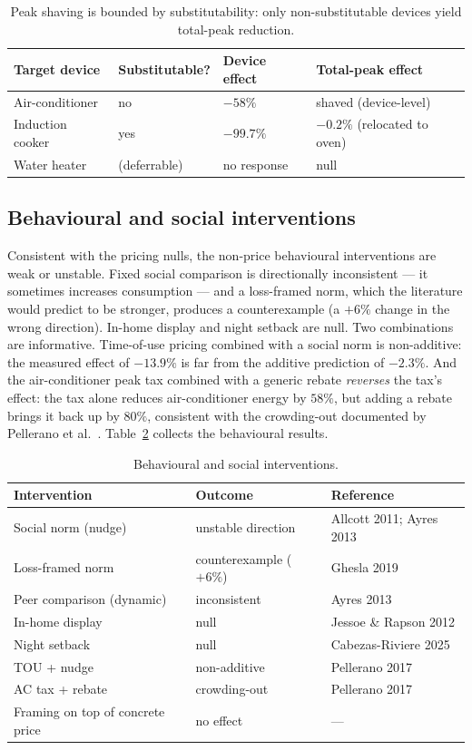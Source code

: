\documentclass[11pt]{article}
\begin{document}
\begin{table}[ht]
\centering\small
\begin{tabular}{llll}
\toprule
Target device & Substitutable? & Device effect & Total-peak effect \\
\midrule
Air-conditioner & no & $-58\%$ & shaved (device-level) \\
Induction cooker & yes & $-99.7\%$ & $-0.2\%$ (relocated to oven) \\
Water heater & (deferrable) & no response & null \\
\bottomrule
\end{tabular}
\caption{Peak shaving is bounded by substitutability: only non-substitutable devices yield total-peak
reduction.}
\label{tab:shave}
\end{table}

\subsection{Behavioural and social interventions}
Consistent with the pricing nulls, the non-price behavioural interventions are weak or unstable. Fixed
social comparison is directionally inconsistent --- it sometimes increases consumption --- and a
loss-framed norm, which the literature would predict to be stronger, produces a counterexample (a
$+6\%$ change in the wrong direction). In-home display and night setback are null. Two combinations are
informative. Time-of-use pricing combined with a social norm is non-additive: the measured effect of
$-13.9\%$ is far from the additive prediction of $-2.3\%$. And the air-conditioner peak tax combined with
a generic rebate \emph{reverses} the tax's effect: the tax alone reduces air-conditioner energy by $58\%$,
but adding a rebate brings it back up by $80\%$, consistent with the crowding-out documented by Pellerano
et al.\ \cite{pellerano2017}. Table~\ref{tab:social} collects the behavioural results.

\begin{table}[ht]
\centering\small
\begin{tabular}{lll}
\toprule
Intervention & Outcome & Reference \\
\midrule
Social norm (nudge) & unstable direction & Allcott 2011; Ayres 2013 \\
Loss-framed norm & counterexample ($+6\%$) & Ghesla 2019 \\
Peer comparison (dynamic) & inconsistent & Ayres 2013 \\
In-home display & null & Jessoe \& Rapson 2012 \\
Night setback & null & Cabezas-Riviere 2025 \\
TOU + nudge & non-additive & Pellerano 2017 \\
AC tax + rebate & crowding-out & Pellerano 2017 \\
Framing on top of concrete price & no effect & --- \\
\bottomrule
\end{tabular}
\caption{Behavioural and social interventions.}
\label{tab:social}
\end{table}
\end{document}
